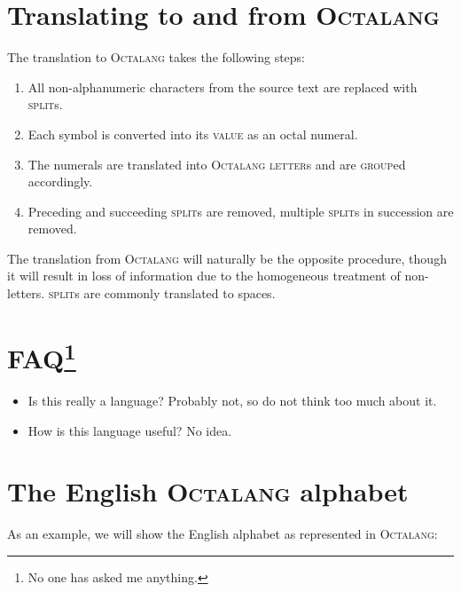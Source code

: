 \documentclass{article}
\newcommand{\octalang}[0]{\textsc{Octalang}}
\newcommand{\tvalue}[0]{\textsc{value}}
\newcommand{\tletter}[0]{\textsc{letter}}
\newcommand{\tgroup}[0]{\textsc{group}}
\newcommand{\tsplit}[0]{\textsc{split}}
\begin{document}
\section*{Translating to and from {\sffamily\octalang{}}}

The translation to \octalang{} takes the following steps:

\begin{enumerate}
  \item All non-alphanumeric characters from the source text are replaced with \tsplit{}s.
  \item Each symbol is converted into its \tvalue{} as an octal numeral.
  \item The numerals are translated into \octalang{} \tletter{}s and are \tgroup{}ed accordingly.
  \item Preceding and succeeding \tsplit{}s are removed, multiple \tsplit{}s in succession are removed.
\end{enumerate}

The translation from \octalang{} will naturally be the opposite procedure, though it will result in loss of information due to the homogeneous treatment of non-letters. \tsplit{}s are commonly translated to spaces.

\section*{FAQ\protect\footnote{No one has asked me anything.}}

\begin{itemize}
  \item Is this really a language? Probably not, so do not think too much about it.
  \item How is this language useful? No idea.
\end{itemize}

\newpage
{}

\section*{The English {\sffamily\octalang{}} alphabet}

As an example, we will show the English alphabet as represented in \octalang{}:
\end{document}
